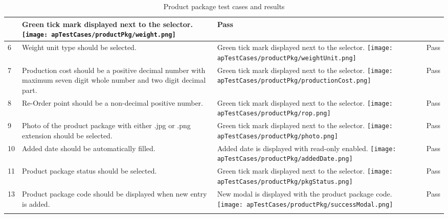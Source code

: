 \documentclass[12pt]{report}
\begin{document}
\begin{longtable}{ | p{1cm} | p{5cm} | p{5cm} | p{2cm} | }
	             &
	Green tick mark displayed next to the selector.\newline
	\texttt{[image: apTestCases/productPkg/weight.png]}
	             &
	Pass                                                                      \\
	\hline
	6
	             &
	Weight unit type should be selected.
	             &
	Green tick mark displayed next to the selector.\newline
	\texttt{[image: apTestCases/productPkg/weightUnit.png]}
	             &
	Pass                                                                      \\
	\hline
	7
	             &
	Production cost should be a positive decimal number with maximum seven digit whole number and two digit decimal part.
	             &
	Green tick mark displayed next to the selector.\newline
	\texttt{[image: apTestCases/productPkg/productionCost.png]}
	             &
	Pass                                                                      \\
	\hline
	8
	             &
	Re-Order point should be a non-decimal positive number.
	             &
	Green tick mark displayed next to the selector.\newline
	\texttt{[image: apTestCases/productPkg/rop.png]}
	             &
	Pass                                                                      \\
	\hline
	9
	             &
	Photo of the product package with either .jpg or .png extension should be selected.
	             &
	Green tick mark displayed next to the selector.\newline
	\texttt{[image: apTestCases/productPkg/photo.png]}
	             &
	Pass                                                                      \\
	\hline
	10
	             &
	Added date should be automatically filled.
	             &
	Added date is displayed with read-only enabled.\newline
	\texttt{[image: apTestCases/productPkg/addedDate.png]}
	             &
	Pass                                                                      \\
	\hline
	11
	             &
	Product package status should be selected.
	             &
	Green tick mark displayed next to the selector.\newline
	\texttt{[image: apTestCases/productPkg/pkgStatus.png]}
	             &
	Pass                                                                      \\
	\hline
	13
	             &
	Product package code should be displayed when new entry is added.
	             &
	New modal is displayed with the product package code.\newline
	\texttt{[image: apTestCases/productPkg/successModal.png]}
	             &
	Pass                                                                      \\
	\hline
	\caption{Product package test cases and results}
\end{longtable}
\end{document}
